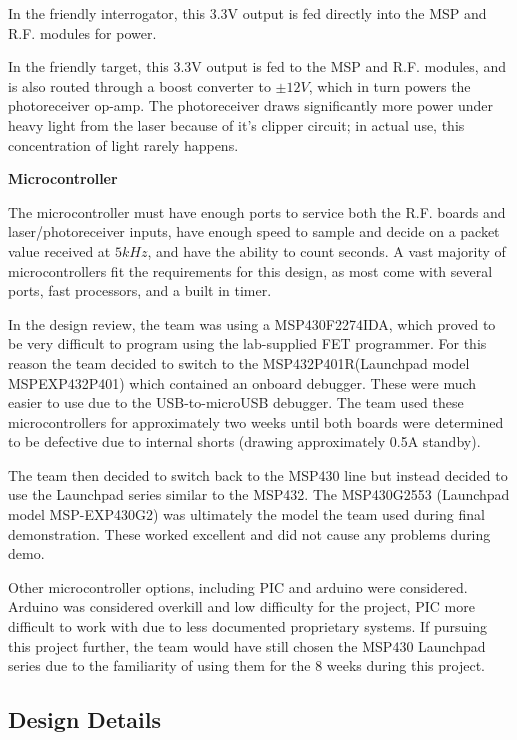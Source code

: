 \documentclass[letterpaper,10pt]{article}
\begin{document}
\begin{spacing}{1.15}
In the friendly interrogator, this 3.3V output is fed directly into the MSP and R.F. modules for power.

In the friendly target, this 3.3V output is fed to the MSP and R.F. modules, and is also routed through a boost converter to $\pm 12V$, which in turn powers the photoreceiver op-amp. The photoreceiver draws significantly more power under heavy light from the laser because of it's clipper circuit; in actual use, this concentration of light rarely happens. 

 
\hspace{5mm}\textbf{Microcontroller} \label{section:system-design-procedure}

The microcontroller must have enough ports to service both the R.F. boards and laser/photoreceiver inputs, have enough speed to sample and decide on a packet value received at $5kHz$, and have the ability to count seconds. A vast majority of microcontrollers fit the requirements for this design, as most come with several ports, fast processors, and a built in timer.

In the design review, the team was using a MSP430F2274IDA, which proved to be very difficult to program using the lab-supplied FET programmer. For this reason the team decided to switch to the MSP432P401R(Launchpad model MSPEXP432P401) which contained an onboard debugger. These were much easier to use due to the USB-to-microUSB debugger. The team used these microcontrollers for approximately two weeks until both boards were determined to be defective due to internal shorts (drawing approximately 0.5A standby).

The team then decided to switch back to the MSP430 line but instead decided to use the Launchpad series similar to the MSP432. The MSP430G2553 (Launchpad model MSP-EXP430G2) was ultimately the model the team used during final demonstration. These worked excellent and did not cause any problems during demo. 

Other microcontroller options, including PIC and arduino were considered. Arduino was considered overkill and low difficulty for the project, PIC more difficult to work with due to less documented proprietary systems. If pursuing this project further, the team would have still chosen the MSP430 Launchpad series due to the familiarity of using them for the 8 weeks during this project.


\subsection{Design Details} \label{section-design-details}



\end{spacing}
\end{document}
